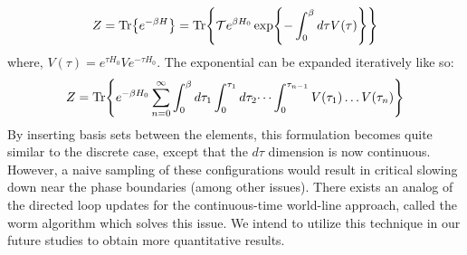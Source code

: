 \begin{equation}
    Z = \Tr{e^{-\beta H}} = \Tr{\mathcal{T} e^{\beta H_0} \exp{-\int_0^{\beta} d\tau V(\tau)}}
\end{equation}
where, $V(\tau) = e^{\tau H_0}Ve^{-\tau H_0}$. The exponential can be expanded iteratively like so:
\begin{equation}
    Z = \Tr{e^{-\beta H_0} \sum_{n = 0}^{\infty} \int_0^{\beta} d\tau_1 \int_0^{\tau_1}d\tau_2\dots\int_0^{\tau_{n-1}} V(\tau_1)\dots V(\tau_n)}
\end{equation}
By inserting basis sets between the elements, this formulation becomes quite similar to the discrete case, except that the $d\tau$ dimension is now continuous. However, a naive sampling of these configurations would result in critical slowing down near the phase boundaries (among other issues)\cite{Prokofev1998}. There exists an analog of the directed loop updates for the continuous-time world-line approach, called the worm algorithm\cite{prokofev2010worm, Pollet_2007, sadoune2022efficient} which solves this issue. We intend to utilize this technique in our future studies to obtain more quantitative results.



